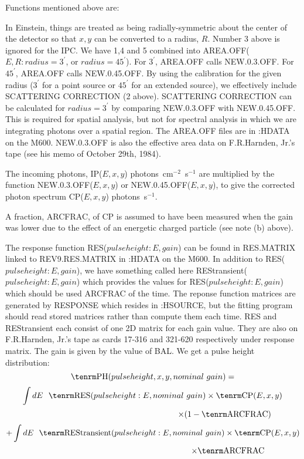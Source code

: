 
Functions mentioned above are:

\vskip 16pt

In Einstein, things are treated as being radially-symmetric
about the center of the detector so that $x,y$ can be converted
to a radius, $R$.  Number 3 above is ignored for the IPC.
We have 1,4 and 5 combined into
AREA.OFF($E,R: radius=3^\prime$, or $radius=45^\prime$).
For $3^\prime$, AREA.OFF calls NEW.0.3.OFF.  For $45^\prime$, AREA.OFF
calls NEW.0.45.OFF.  By using the calibration for the given
radius ($3 ^\prime$ for a point source or $45^\prime$ for an extended
source), we effectively include SCATTERING CORRECTION (2 above).
SCATTERING CORRECTION can be calculated for $radius=3^\prime$ by comparing
NEW.0.3.OFF with NEW.0.45.OFF.  This is required for spatial
analysis, but not for spectral analysis in which we are
integrating photons over a spatial region.  The AREA.OFF files are in
:HDATA on the M600.  NEW.0.3.OFF is also the effective area
data on F.R.Harnden, Jr.'s tape (see his memo of October 29th, 1984).

The incoming photons, IP($E,x,y$) photons~cm$^{-2}$~s$^{-1}$
are multiplied by the function
NEW.0.3.OFF($E,x,y$) or NEW.0.45.OFF($E,x,y$), to give the corrected
photon spectrum CP($E,x,y$) photons~s$^{-1}$.

\vskip 16pt

A fraction, ARCFRAC, of CP is assumed to have been measured when
the gain was lower due to the effect of an energetic charged particle
(see note (b) above).

The response function RES($pulseheight:E,gain$) can be found in
RES.MATRIX linked
to REV9.RES.MATRIX in :HDATA on the M600.  In addition to 
RES($pulseheight:E,gain$),
we have something called here REStransient($pulseheight:E,gain$) which
provides the values for RES($pulseheight:E,gain$) which should be
used ARCFRAC of the time.  The reponse function matrices are generated by
RESPONSE which resides in :HSOURCE, but the fitting program should read stored
matrices rather than compute them each time.
RES and REStransient each consist of one 2D matrix for
each gain value.  They are also on F.R.Harnden, Jr.'s tape as
cards 17-316 and 321-620 respectively under response matrix.
The gain is given by the value of BAL.  We get a pulse height
distribution:
$${\rm PH}(pulseheight,x,y,nominal~gain) =$$
$$\int dE~~{\rm RES}(pulseheight:E,nominal~gain) \times {\rm CP(}E,x,y)$$
$$~~~~~~~~~~~~~~~~~~~~~~~~~~~~~~~~~~~~~~~~~~~~~~~~~~~~~ \times (1-{\rm ARCFRAC})$$
$$ +\int dE~~{\rm REStransient}(pulseheight:E,nominal~gain) \times {\rm
CP}(E,x,y)$$
$$~~~~~~~~~~~~~~~~~~~~~~~~~~~~~~~~~~~~~~~~~~~~~~~~~~~~~~~ \times {\rm ARCFRAC}$$

